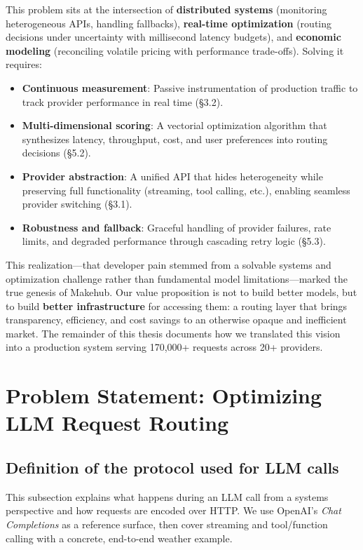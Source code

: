 \documentclass[english]{article}
\begin{document}
This problem sits at the intersection of \textbf{distributed systems} (monitoring heterogeneous APIs, handling fallbacks), \textbf{real-time optimization} (routing decisions under uncertainty with millisecond latency budgets), and \textbf{economic modeling} (reconciling volatile pricing with performance trade-offs). Solving it requires:
\begin{itemize}
    \item \textbf{Continuous measurement}: Passive instrumentation of production traffic to track provider performance in real time (§3.2).
    \item \textbf{Multi-dimensional scoring}: A vectorial optimization algorithm that synthesizes latency, throughput, cost, and user preferences into routing decisions (§5.2).
    \item \textbf{Provider abstraction}: A unified API that hides heterogeneity while preserving full functionality (streaming, tool calling, etc.), enabling seamless provider switching (§3.1).
    \item \textbf{Robustness and fallback}: Graceful handling of provider failures, rate limits, and degraded performance through cascading retry logic (§5.3).
\end{itemize}

\medskip

\noindent This realization—that developer pain stemmed from a solvable systems and optimization challenge rather than fundamental model limitations—marked the true genesis of Makehub. Our value proposition is not to build better models, but to build \textbf{better infrastructure} for accessing them: a routing layer that brings transparency, efficiency, and cost savings to an otherwise opaque and inefficient market. The remainder of this thesis documents how we translated this vision into a production system serving 170,000+ requests across 20+ providers.



\newpage
\section{Problem Statement: Optimizing LLM Request Routing}
\subsection{Definition of the protocol used for LLM calls}

This subsection explains what happens during an LLM call from a systems perspective and how requests are encoded over HTTP. We use OpenAI's \emph{Chat Completions} as a reference surface, then cover streaming and tool/function calling with a concrete, end-to-end weather example.
\end{document}
